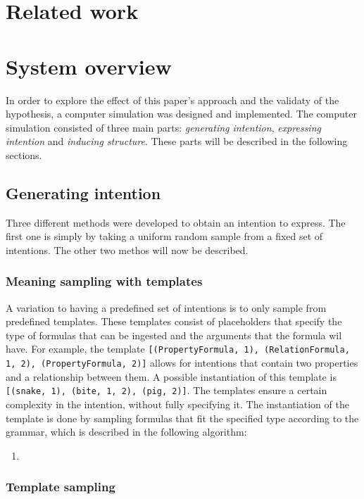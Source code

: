 \documentclass[a4paper]{article}
\begin{document}
\section{Related work}
\section{System overview}
\label{sec:system_overview}
In order to explore the effect of this paper's approach and the validaty of the hypothesis, a computer simulation was designed and implemented. The computer simulation consisted of three main parts: \emph{generating intention}, \emph{expressing intention} and \emph{inducing structure}. These parts will be described in the following sections.
\subsection{Generating intention}
Three different methods were developed to obtain an intention to express. The first one is simply by taking a uniform random sample from a fixed set of intentions. The other two methos will now be described.
\subsubsection{Meaning sampling with templates}
A variation to having a predefined set of intentions is to only sample from predefined templates. These templates consist of placeholders that specify the type of formulas that can be ingested and the arguments that the formula wil have. For example, the template \verb|[(PropertyFormula, 1), (RelationFormula, 1, 2), (PropertyFormula, 2)]| allows for intentions that contain two properties and a relationship between them. A possible instantiation of this template is \verb|[(snake, 1), (bite, 1, 2), (pig, 2)]|. The templates ensure a certain complexity in the intention, without fully specifying it. The instantiation of the template is done by sampling formulas that fit the specified type according to the grammar, which is described in the following algorithm:
\begin{enumerate}
    \item 
\end{enumerate}

\subsubsection{Template sampling}
\end{document}
